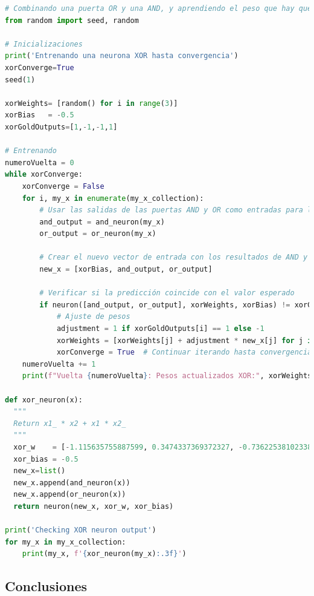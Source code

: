 \documentclass{report}
\begin{document}
        \clearpage
        \begin{lstlisting}[language=Python, caption=Implementación del perceptron para las puerta lógica XOR]
# Combinando una puerta OR y una AND, y aprendiendo el peso que hay que darle a cada una para obtener un XOR 
from random import seed, random

# Inicializaciones
print('Entrenando una neurona XOR hasta convergencia')
xorConverge=True
seed(1)

xorWeights= [random() for i in range(3)]
xorBias   = -0.5
xorGoldOutputs=[1,-1,-1,1]

# Entrenando
numeroVuelta = 0
while xorConverge:
    xorConverge = False
    for i, my_x in enumerate(my_x_collection):
        # Usar las salidas de las puertas AND y OR como entradas para la XOR
        and_output = and_neuron(my_x)
        or_output = or_neuron(my_x)
        
        # Crear el nuevo vector de entrada con los resultados de AND y OR
        new_x = [xorBias, and_output, or_output]
        
        # Verificar si la predicción coincide con el valor esperado
        if neuron([and_output, or_output], xorWeights, xorBias) != xorGoldOutputs[i]:
            # Ajuste de pesos
            adjustment = 1 if xorGoldOutputs[i] == 1 else -1
            xorWeights = [xorWeights[j] + adjustment * new_x[j] for j in range(len(xorWeights))]
            xorConverge = True  # Continuar iterando hasta convergencia
    numeroVuelta += 1
    print(f"Vuelta {numeroVuelta}: Pesos actualizados XOR:", xorWeights)

def xor_neuron(x):
  """
  Return x1_ * x2 + x1 * x2_
  """
  xor_w    = [-1.115635755887599, 0.3474337369372327, -0.7362253810233859]
  xor_bias = -0.5
  new_x=list()
  new_x.append(and_neuron(x))
  new_x.append(or_neuron(x))
  return neuron(new_x, xor_w, xor_bias)

print('Checking XOR neuron output')
for my_x in my_x_collection:
    print(my_x, f'{xor_neuron(my_x):.3f}')
        \end{lstlisting}
        \clearpage
      \subsection*{Conclusiones}
\end{document}
